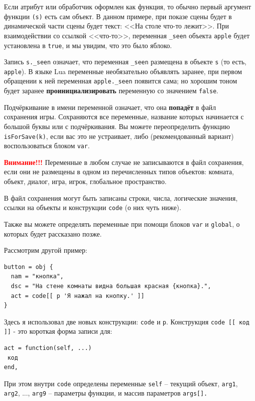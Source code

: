 \documentclass[a4paper,12pt]{article}
\begin{document}
Если атрибут или обработчик оформлен как функция, то обычно первый аргумент функции \verb/(s)/ есть сам объект. В данном примере, при показе сцены будет в динамической части сцены будет текст: <<На столе что-то лежит>>. При взаимодействии со ссылкой <<что-то>>, переменная \verb/_seen/ объекта \verb/apple/ будет установлена в \verb/true/, и мы увидим, что это было яблоко.

Запись \verb/s._seen/ означает, что переменная \verb/_seen/ размещена в объекте \verb/s/ (то есть, \verb/apple/). В языке Lua переменные необязательно объявлять заранее, при первом обращении к ней переменная \verb/apple._seen/ появится сама; но хорошим тоном будет заранее \textbf{проинициализировать} переменную со значением \verb/false/.

Подчёркивание в имени переменной означает, что она \textbf{попадёт} в файл сохранения игры. Сохраняются все переменные, название которых начинается с большой буквы или с подчёркивания. Вы можете переопределить функцию \verb/isForSave(k)/, если вас это не устраивает, либо (рекомендованный вариант) воспользоваться блоком \verb/var/.

\textbf{\textcolor{red}{Внимание!!!}} Переменные в любом случае не записываются в файл сохранения, если они не размещены в одном из перечисленных типов объектов: комната, объект, диалог, игра, игрок, глобальное пространство.

В файл сохранения могут быть записаны строки, числа, логические значения, ссылки на объекты и конструкции \verb/code/ (о них чуть ниже).

Также вы можете определять переменные при помощи блоков \verb/var/ и \verb/global/, о которых будет рассказано позже.

Рассмотрим другой пример:

\begin{verbatim}
button = obj {
  nam = "кнопка",
  dsc = "На стене комнаты видна большая красная {кнопка}.",
  act = code[[ p 'Я нажал на кнопку.' ]]
}
\end{verbatim}

Здесь я использовал две новых конструкции: \verb/code/ и \verb/p/. Конструкция \verb/code [[ код ]]/ - это короткая форма записи для:

\begin{verbatim}
act = function(self, ...)
 код
end,
\end{verbatim}

При этом внутри \verb/code/ определены переменные \verb/self/ -- текущий объект, \verb/arg1/, \verb/arg2/, ..., \verb/arg9/ -- параметры функции, и массив параметров \verb/args[]./
\end{document}
